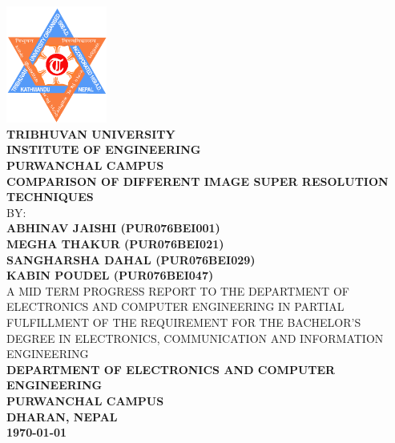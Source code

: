 \thispagestyle{empty} %



{
	\thispagestyle{empty}
	\centering
	\normalsize
	  
	\includegraphics[width=1.3in]{./figures/TUlogo.png}\\[0.5cm]
	{\bf{TRIBHUVAN UNIVERSITY}\\
	{INSTITUTE OF ENGINEERING}\\
	PURWANCHAL CAMPUS}
	\\[1cm]
	
	{\bf COMPARISON OF DIFFERENT IMAGE SUPER RESOLUTION TECHNIQUES}\\[1cm]
	
	BY:\\
	{\bf ABHINAV JAISHI (PUR076BEI001)}\\
	{\bf MEGHA THAKUR (PUR076BEI021)}\\
	{\bf SANGHARSHA DAHAL (PUR076BEI029)}\\
	{\bf KABIN POUDEL (PUR076BEI047)}\\[1.5cm]

	



	A MID TERM PROGRESS REPORT TO THE DEPARTMENT OF ELECTRONICS AND COMPUTER
	ENGINEERING IN PARTIAL FULFILLMENT OF THE REQUIREMENT FOR THE BACHELOR'S
	DEGREE IN ELECTRONICS, COMMUNICATION AND INFORMATION ENGINEERING\\[0.5cm]
	
	{\bf DEPARTMENT OF ELECTRONICS AND COMPUTER ENGINEERING\\
	PURWANCHAL CAMPUS\\
	DHARAN, NEPAL}\\[1.5cm]

	{\bf\today}
	
	
}

